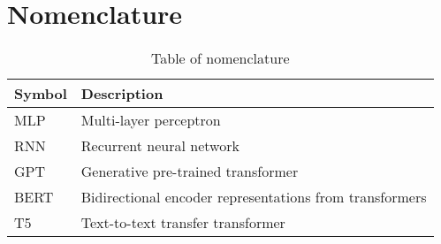 \chapter{Nomenclature}\label{app:nomenclature}

\begin{table}[H]
    \centering
    \begin{tabular}{ll}
        \toprule
        \textbf{Symbol} & \textbf{Description}                                    \\
        \midrule
        MLP             & Multi-layer perceptron                                  \\
        RNN             & Recurrent neural network                                \\
        GPT             & Generative pre-trained transformer                      \\
        BERT            & Bidirectional encoder representations from transformers \\
        T5              & Text-to-text transfer transformer                       \\
        \bottomrule
    \end{tabular}
    \caption{Table of nomenclature}
    \label{tab:nomenclature}
\end{table}